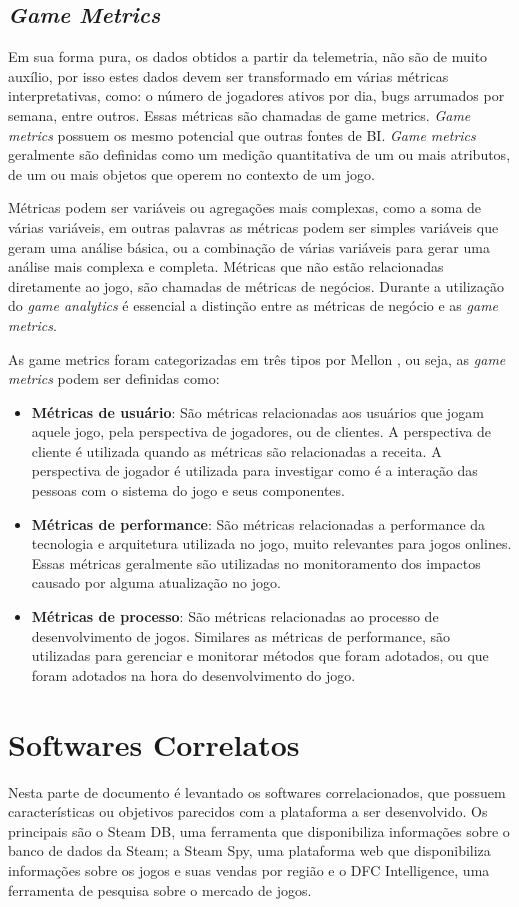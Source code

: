 \subsection{\textit{Game Metrics}}
Em sua forma pura, os dados obtidos a partir da telemetria, não são de muito auxílio, por isso estes dados devem ser transformado em várias métricas interpretativas, como: o número de jogadores ativos por dia, bugs arrumados por semana, entre outros. Essas métricas são chamadas de game metrics. \textit{Game metrics} possuem os mesmo potencial que outras fontes de BI. \textit{Game metrics} geralmente são definidas como um medição quantitativa de um ou mais atributos, de um ou mais objetos que operem no contexto de um jogo.

Métricas podem ser variáveis ou  agregações mais complexas, como a soma de várias variáveis, em outras palavras as métricas podem ser simples variáveis que geram uma análise básica, ou a combinação de várias variáveis para gerar uma análise mais complexa e completa. Métricas que não estão relacionadas diretamente ao jogo, são chamadas de métricas de negócios. Durante a utilização do \textit{game analytics} é essencial a distinção entre as métricas de negócio e as \textit{game metrics}.

As game metrics foram categorizadas em três tipos por Mellon \cite{game_metrics}, ou seja, as \textit{game metrics} podem ser definidas como:
\begin{itemize}
	\item \textbf{Métricas de usuário}: São métricas relacionadas aos usuários que jogam aquele jogo, pela perspectiva de jogadores, ou de clientes. A perspectiva de cliente é utilizada quando as métricas são relacionadas a receita. A perspectiva de jogador é utilizada para investigar como é a interação das pessoas com o sistema do jogo e seus componentes.
	\item \textbf{Métricas de performance}: São métricas relacionadas a performance da tecnologia e arquitetura utilizada no jogo, muito relevantes para jogos onlines. Essas métricas geralmente são utilizadas no monitoramento dos impactos causado por alguma atualização no jogo.
	\item \textbf{Métricas de processo}: São métricas relacionadas ao processo de desenvolvimento de jogos. Similares as métricas de performance, são utilizadas para gerenciar e monitorar métodos que foram adotados, ou que foram adotados na hora do desenvolvimento do jogo. 
\end{itemize}
\section{Softwares Correlatos}
Nesta parte de documento é levantado os softwares correlacionados, que possuem características ou objetivos parecidos com a plataforma a ser desenvolvido. Os principais são o Steam DB, uma ferramenta que disponibiliza informações sobre o banco de dados da Steam; a Steam Spy, uma plataforma web que disponibiliza informações sobre os jogos e suas vendas por região e o DFC Intelligence, uma ferramenta de pesquisa sobre o mercado de jogos.
